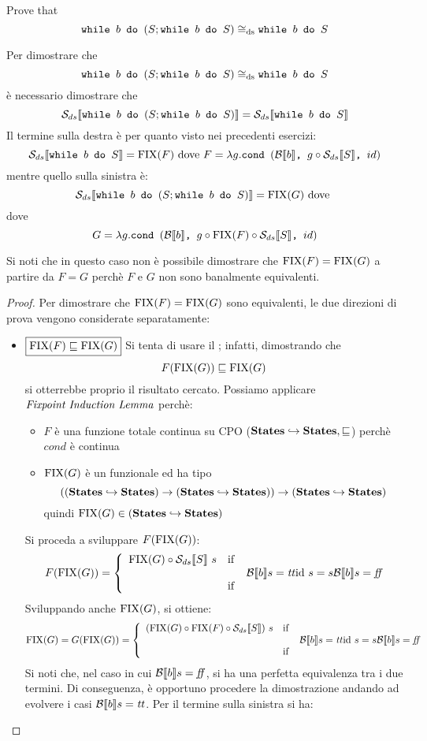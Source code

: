 {Prove that
$$
	 \wbS{b}{(S; \wbS{b}{S})} \eqDS \wbS{b}{S}
$$
}
{
Per dimostrare che 
$$
	 \wbS{b}{(S; \wbS{b}{S})} \eqDS \wbS{b}{S}
$$	
è necessario dimostrare che
$$
\dsCtxt{\wbS{b}{(S; \wbS{b}{S})}} = \dsCtxt{\wbS{b}{S}}
$$
Il termine sulla destra è per quanto visto nei precedenti esercizi:
$$
\dsCtxt{\wbS{b}{S}} =
\fixp{F} \text{ dove } F = \lambda g. \cond{b}{g \circ \dsCtxt{S}}{id}
$$
mentre quello sulla sinistra è:
$$
\dsCtxt{\wbS{b}{(S; \wbS{b}{S}})} = \fixp{G} \text{ dove }
$$
dove
$$
G = \lambda g. \cond{b}{g \circ \fixp{F} \circ \dsCtxt{S}}{id}
$$

Si noti che in questo caso non è possibile dimostrare che $\fixp{F} = \fixp{G}$
a partire da $F = G$ perchè $F$ e $G$ non sono banalmente equivalenti.

\begin{proof}
Per dimostrare che $\fixp{F} = \fixp{G}$ sono equivalenti, le due direzioni di
prova vengono considerate separatamente:
\begin{itemize}
	\item $\boxed{\fixp{F} \sqsubseteq \fixp{G}}$
	Si tenta di usare il \FPIL; infatti, dimostrando che
	$$
	F(\fixp{G}) \sqsubseteq \fixp{G}
	$$
	si otterrebbe proprio il risultato cercato.
  Possiamo applicare $\FPIL$ perchè:
  \begin{itemize}
   \item $F$ è una funzione totale continua su CPO 
($\states \hookrightarrow \states, \sqsubseteq$) perchè $cond$ è continua
   \item $\fixp{G}$ è un funzionale ed ha tipo 
$$
((\states \hookrightarrow \states) \rightarrow 
(\states \hookrightarrow \states)) \rightarrow
(\states \hookrightarrow \states)
$$ 
quindi $\fixp{G} \in 
(\states \hookrightarrow \states)$
  \end{itemize}
  Si proceda a sviluppare $F(\fixp{G})$:
  $$
  F(\fixp{G}) = \caseFun{\fixp{G} \circ \dsCtxt{S}\ s}
                        {\B{b} = \semtrue}
                        {\idDS\ s = s}
                        {\B{b} = \semfalse}
  $$
  Sviluppando anche $\fixp{G}$, si ottiene:
  $$
  \fixp{G} =
  G(\fixp{G}) = \caseFun{(\fixp{G} \circ \fixp{F} \circ \dsCtxt{S})\ s}
                        {\B{b} = \semtrue}
                        {\idDS\ s = s}
                        {\B{b} = \semfalse}
  $$
  Si noti che, nel caso in cui $\B{b} = \semfalse$, si ha una perfetta
  equivalenza tra i due termini.
  Di conseguenza, è opportuno procedere la dimostrazione andando ad evolvere i
  casi $\B{b} = \semtrue$. Per il termine sulla sinistra si ha:

\end{itemize}
\end{proof}}
